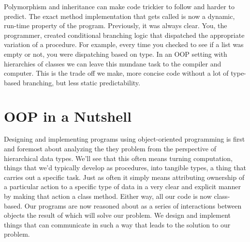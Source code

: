 \documentclass[nobib]{tufte-handout}
\begin{document}
Polymorphism and inheritance can make code trickier to follow and harder to predict. The exact method implementation that gets called is now a dynamic, run-time property of the program. Previously, it was always clear. You, the programmer, created conditional branching logic that dispatched the appropriate variation of a procedure. For example, every time you checked to see if a list was empty or not, you were dispatching based on type. In an OOP setting with hierarchies of classes we can leave this mundane task to the compiler and computer. This is the trade off we make, more concise code without a lot of type-based branching, but less static predictability.

\section{OOP in a Nutshell}

Designing and implementing programs using object-oriented programming is first and foremost about analyzing the they problem from the perspective of hierarchical data types. We'll see that this often means turning computation, things that we'd typically develop as procedures, into tangible types, a thing that carries out a specific task. Just as often it simply means attributing ownership of a particular action to a specific type of data in a very clear and explicit manner by making that action a class method. Either way, all our code is now class-based. Our programs are now reasoned about as a series of interactions between objects the result of which will solve our problem. We design and implement things that can communicate in such a way that leads to the solution to our problem.
\end{document}
